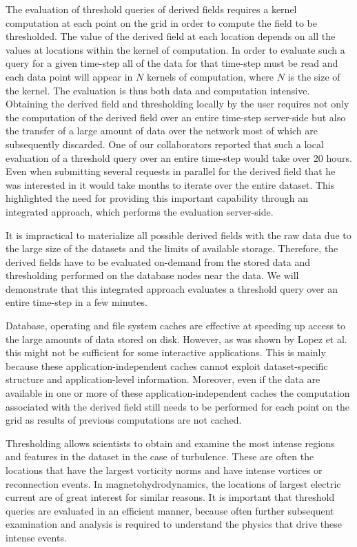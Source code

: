 \documentclass{sig-alternate}
\begin{document}
The evaluation of threshold queries of derived fields requires a kernel computation at each point on the grid in order to compute the field to be thresholded.
The value of the derived field at each location depends on all the values at locations within the kernel of computation. 
In order to evaluate such a query for a given time-step all of the data for that time-step must be read and each data point 
will appear in $N$ kernels of computation, where $N$ is the size of the kernel. The evaluation is thus both data and computation intensive.
Obtaining the derived field and thresholding locally by the user requires not only the computation of the derived field over an entire time-step server-side 
but also the transfer of a large amount of data over the network most of which are subsequently discarded. 
One of our collaborators reported that such a local evaluation of a threshold
query over an entire time-step would take over 20 hours. Even when submitting several requests in parallel for the derived field that he was interested in it
would take months to iterate over the entire dataset. This highlighted the need for providing this important capability through an integrated approach,
which performs the evaluation server-side.

It is impractical to materialize all possible derived fields with the raw data
due to the large size of the datasets and the limits of available storage. Therefore, the derived fields 
have to be evaluated on-demand from the stored data and thresholding performed on the database nodes near the data.
We will demonstrate that this integrated approach evaluates a threshold query over an entire time-step in a few minutes.

Database, operating and file system caches are effective at speeding up access to the large amounts of data stored on disk. However, as was
shown by Lopez et al. \cite{Lopez} this might not be sufficient for some interactive applications. This is mainly because these application-independent 
caches cannot exploit dataset-specific structure and application-level information. Moreover, even if the data are available in one or more of these
application-independent caches the
computation associated with the derived field still needs to be performed for each point on the grid as results of previous computations are not cached. 

Thresholding allows scientists to obtain and examine the most intense regions and features in the dataset in the case of turbulence. 
These are often the locations that have the largest vorticity norms and have intense vortices or reconnection events. 
In magnetohydrodynamics, the locations of largest electric current are of great interest for similar reasons.
It is important that threshold queries are evaluated in an efficient manner, because often further subsequent examination
and analysis is required to understand the physics that drive these intense events. 
\end{document}
